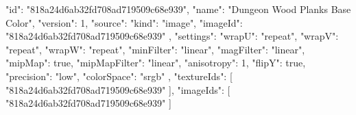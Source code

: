 {
  "id": "818a24d6ab32fd708ad719509c68e939",
  "name": "Dungeon Wood Planks Base Color",
  "version": 1,
  "source": {
    "kind": "image",
    "imageId": "818a24d6ab32fd708ad719509c68e939"
  },
  "settings": {
    "wrapU": "repeat",
    "wrapV": "repeat",
    "wrapW": "repeat",
    "minFilter": "linear",
    "magFilter": "linear",
    "mipMap": true,
    "mipMapFilter": "linear",
    "anisotropy": 1,
    "flipY": true,
    "precision": "low",
    "colorSpace": "srgb"
  },
  "textureIds": [
    "818a24d6ab32fd708ad719509c68e939"
  ],
  "imageIds": [
    "818a24d6ab32fd708ad719509c68e939"
  ]
}
